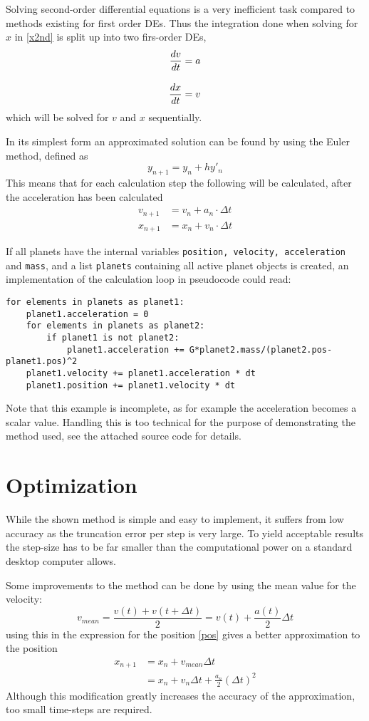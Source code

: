\documentclass[titlepage, oneside, a4paper, 11pt]{article}
\begin{document}
Solving second-order differential equations is a very inefficient
task compared to methods existing for first order DEs. Thus the
integration done when solving for $x$ in \eqref{x2nd} is split up into
two firs-order DEs, 
\begin{align}
  \frac{dv}{dt} &= a \\
  \frac{dx}{dt} &= v \rule{0pt}{23pt}
\end{align}
which will be solved for $v$ and $x$ sequentially. 

In its simplest form an approximated solution can be found by using
the Euler method, defined as
\begin{equation}
  y_{n+1} = y_n + hy'_n
\end{equation}
This means that for each calculation step the following will be
calculated, after the acceleration has been calculated
\begin{align}
  v_{n+1} &= v_{n} + a_{n} \cdot \Delta t \\
  \label{pos}
  x_{n+1} &= x_{n} + v_{n} \cdot \Delta t
\end{align}

If all planets have the internal variables \texttt{position, velocity,
  acceleration} and \texttt{mass}, and a list \texttt{planets}
containing all active planet objects is created, an implementation of
the calculation loop in pseudocode could read:
\begin{verbatim}
for elements in planets as planet1:
    planet1.acceleration = 0
    for elements in planets as planet2:
        if planet1 is not planet2:
            planet1.acceleration += G*planet2.mass/(planet2.pos-planet1.pos)^2
    planet1.velocity += planet1.acceleration * dt
    planet1.position += planet1.velocity * dt
\end{verbatim}
Note that this example is incomplete, as for example the acceleration
becomes a scalar value. Handling this is too technical for the purpose
of demonstrating the method used, see the attached source code for
details.

\section{Optimization}
While the shown method is simple and easy to implement, it suffers
from low accuracy as the truncation error per step is very large. To
yield acceptable results the step-size has to be far smaller than the
computational power on a standard desktop computer allows. 

Some improvements to the method can be done by using the mean value for
the velocity:
\begin{equation}
  v_{mean} = \frac{v(t) + v(t+\Delta t)}{2} = v(t) +
  \frac{a(t)}{2} \Delta t
\end{equation}
using this in the expression for the position \eqref{pos} gives a
better approximation to the position
\begin{align}
  x_{n+1} &= x_{n} + v_{mean} \Delta t \\
         &= x_{n} + v_{n} \Delta t +
  \frac{a_n}{2}(\Delta t)^2
\end{align}
Although this modification greatly increases the accuracy of the
approximation, too small time-steps are required. 
\end{document}
